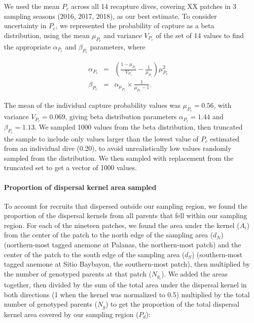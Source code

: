 \documentclass[12pt, oneside]{article}   	%
\begin{document}
We used the mean $P_c$ across all 14 recapture dives, covering XX patches in 3 sampling seasons (2016, 2017, 2018), as our best estimate. To consider uncertainty in $P_c$, we represented the probability of capture as a beta distribution, using the mean $\mu_{P_c}$ and variance $V_{P_c}$ of the set of 14 values to find the appropriate $\alpha_{P_c}$ and $\beta_{P_c}$ parameters, where 

\begin{eqnarray}
\alpha_{P_c} &=& (\frac{1-\mu_{P_c}}{V_{P_c}} - \frac{1}{\mu_{P_c}}) \mu_{P_c}^2 \\
\beta_{P_c} &=& \alpha_{\mu_{P_c}} \times \frac{1}{\mu_{P_c} - 1}. \label{APP_EQN_ProbCapBetaDistParams}  %
\end{eqnarray}

The mean of the individual capture probability values was $\mu_{P_c} = 0.56$, with variance $V_{P_c} = 0.069$, giving beta distribution parameters $\alpha_{P_c} = 1.44$ and $\beta_{P_c} = 1.13$. We sampled 1000 values from the beta distribution, then truncated the sample to include only values larger than the lowest value of $P_c$ estimated from an individual dive (0.20), to avoid unrealistically low values randomly sampled from the distribution. We then sampled with replacement from the truncated set to get a vector of 1000 values.

\paragraph{Proportion of dispersal kernel area sampled} \label{APP_SEC_PropDispKernelSampled}

To account for recruits that dispersed outside our sampling region, we found the proportion of the dispersal kernels from all parents that fell within our sampling region. For each of the nineteen patches, we found the area under the kernel ($A_i$) from the center of the patch to the north edge of the sampling area ($d_N$) (northern-most tagged anemone at Palanas, the northern-most patch) and the center of the patch to the south edge of the sampling area ($d_S$) (southern-most tagged anemone at Sitio Baybayon, the southern-most patch), then multiplied by the number of genotyped parents at that patch ($N_{g_i}$). We added the areas together, then divided by the sum of the total area under the dispersal kernel in both directions (1 when the kernel was normalized to 0.5) multiplied by the total number of genotyped parents ($N_g$) to get the proportion of the total dispersal kernel area covered by our sampling region ($P_d$):
\end{document}
